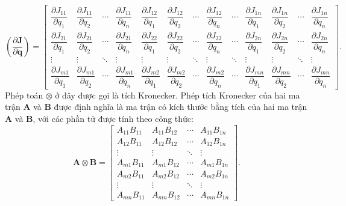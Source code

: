 \begin{equation}
    \left( \dfrac{\partial \mathbf{J}}{\partial \mathbf{q}} \right) = 
    \left[
    \begin{array}{ccccccccccccc}
        \dfrac{\partial J_{11}}{\partial q_1} & \dfrac{\partial J_{11}}{\partial q_2} & \cdots & \dfrac{\partial J_{11}}{\partial q_n} & \dfrac{\partial J_{12}}{\partial q_1} & \dfrac{\partial J_{12}}{\partial q_2} & \cdots & \dfrac{\partial J_{12}}{\partial q_n} & \cdots & \dfrac{\partial J_{1n}}{\partial q_1} & \dfrac{\partial J_{1n}}{\partial q_2} & \cdots & \dfrac{\partial J_{1n}}{\partial q_n} \\
        \dfrac{\partial J_{21}}{\partial q_1} & \dfrac{\partial J_{21}}{\partial q_2} & \cdots & \dfrac{\partial J_{21}}{\partial q_n} & \dfrac{\partial J_{22}}{\partial q_1} & \dfrac{\partial J_{22}}{\partial q_2} & \cdots & \dfrac{\partial J_{22}}{\partial q_n} & \cdots & \dfrac{\partial J_{2n}}{\partial q_1} & \dfrac{\partial J_{2n}}{\partial q_2} & \cdots & \dfrac{\partial J_{2n}}{\partial q_n} \\
        \vdots & \vdots & \ddots & \vdots & \vdots & \vdots & \ddots & \vdots & \ddots & \vdots & \vdots & \ddots & \vdots \\
        \dfrac{\partial J_{m1}}{\partial q_1} & \dfrac{\partial J_{m1}}{\partial q_2} & \cdots & \dfrac{\partial J_{m1}}{\partial q_n} & \dfrac{\partial J_{m2}}{\partial q_1} & \dfrac{\partial J_{m2}}{\partial q_2} & \cdots & \dfrac{\partial J_{m2}}{\partial q_n} & \cdots & \dfrac{\partial J_{mn}}{\partial q_1} & \dfrac{\partial J_{mn}}{\partial q_2} & \cdots & \dfrac{\partial J_{mn}}{\partial q_n}
    \end{array}
    \right].
\end{equation}
Phép toán \(\otimes\) ở đây được gọi là tích Kronecker. Phép tích Kronecker của hai ma trận \(\mathbf{A}\) và \(\mathbf{B}\) được định nghĩa là ma trận có kích thước bằng tích của hai ma trận \(\mathbf{A}\) và \(\mathbf{B}\), với các phần tử được tính theo công thức:
\begin{equation}
    \mathbf{A} \otimes \mathbf{B} = 
    \left[
    \begin{array}{cccc}
        A_{11} B_{11} & A_{11} B_{12} & \cdots & A_{11} B_{1n} \\
        A_{12} B_{11} & A_{12} B_{12} & \cdots & A_{12} B_{1n} \\
        \vdots & \vdots & \ddots & \vdots \\
        A_{m1} B_{11} & A_{m1} B_{12} & \cdots & A_{m1} B_{1n} \\
        A_{m2} B_{11} & A_{m2} B_{12} & \cdots & A_{m2} B_{1n} \\
        \vdots & \vdots & \ddots & \vdots \\
        A_{mn} B_{11} & A_{mn} B_{12} & \cdots & A_{mn} B_{1n}
    \end{array}
    \right].
\end{equation}
